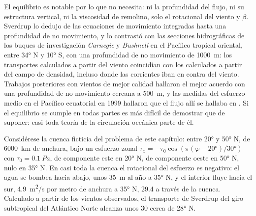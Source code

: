 El equilibrio es notable por lo que no necesita: ni la profundidad del
flujo, ni su estructura vertical, ni la viscosidad de remolino, solo el
rotacional del viento y $\beta$. Sverdrup lo dedujo de las ecuaciones de
movimiento integradas hasta una profundidad de no movimiento, y lo contrastó con las
secciones hidrográficas de los buques de investigación \emph{Carnegie} y
\emph{Bushnell} en el Pacífico tropical oriental, entre \ang{34} N y
\ang{10} S, con una profundidad de no movimiento de \qty{1000}{m}: los transportes
calculados a partir del viento coincidían con los calculados a partir del campo de densidad, incluso
donde las corrientes iban en contra del viento. Trabajos posteriores con vientos de mejor calidad
hallaron el mejor acuerdo con una profundidad de no movimiento cercana a \qty{500}{m}, y
las medidas del esfuerzo medio en el Pacífico ecuatorial en 1999 hallaron que el
flujo allí se hallaba en . Si el equilibrio se cumple en todas partes es
más difícil de demostrar que de suponer: casi toda teoría de la circulación oceánica
parte de él.

Considérese la cuenca ficticia del problema de este capítulo: entre \ang{20} y
\ang{50} N, de \qty{6000}{km} de anchura, bajo un esfuerzo zonal $\tau_x =
-\tau_0\cos(\pi(\varphi - \ang{20})/\ang{30})$ con $\tau_0 =
\qty{0.1}{Pa}$, de componente este en \ang{20} N, de componente oeste en \ang{50} N, nulo en
\ang{35} N. En casi toda la cuenca el rotacional del esfuerzo es negativo: el
agua se bombea hacia abajo, unos \qty{35}{m} al año a \ang{35} N, y el
interior fluye hacia el sur, \qty{4.9}{m^2/s} por metro de anchura a \ang{35} N,
\qty{29.4}{\sverdrup} a través de la cuenca. Calculado a partir de los vientos observados,
el transporte de Sverdrup del giro subtropical del Atlántico Norte alcanza unos
\qty{30}{\sverdrup} cerca de \ang{28} N.

